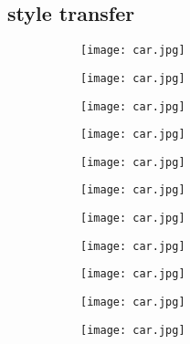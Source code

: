 \subsection{style transfer}
\begin{figure}[H]
	\centering
	\begin{subfigure}[b]{0.225\linewidth}
		\texttt{[image: car.jpg]} %
	\end{subfigure}
	\begin{subfigure}[b]{0.225\linewidth}
		\texttt{[image: car.jpg]} %
	\end{subfigure}
	\begin{subfigure}[b]{0.225\linewidth}
		\texttt{[image: car.jpg]} %
	\end{subfigure}
	\begin{subfigure}[b]{0.225\linewidth}
		\texttt{[image: car.jpg]} %
	\end{subfigure}
	\centering
	\begin{subfigure}[b]{0.225\linewidth}
		\texttt{[image: car.jpg]} %
	\end{subfigure}
	\begin{subfigure}[b]{0.225\linewidth}
		\texttt{[image: car.jpg]} %
	\end{subfigure}
	\begin{subfigure}[b]{0.225\linewidth}
		\texttt{[image: car.jpg]} %
	\end{subfigure}
	\begin{subfigure}[b]{0.225\linewidth}
		\texttt{[image: car.jpg]} %
	\end{subfigure}
	\centering
	\begin{subfigure}[b]{0.225\linewidth}
		\texttt{[image: car.jpg]} %
	\end{subfigure}
	\begin{subfigure}[b]{0.225\linewidth}
		\texttt{[image: car.jpg]} %
	\end{subfigure}
	\begin{subfigure}[b]{0.225\linewidth}
		\texttt{[image: car.jpg]} %
	\end{subfigure}
	\begin{subfigure}[b]{0.225\linewidth}

\end{subfigure}
\end{figure}
